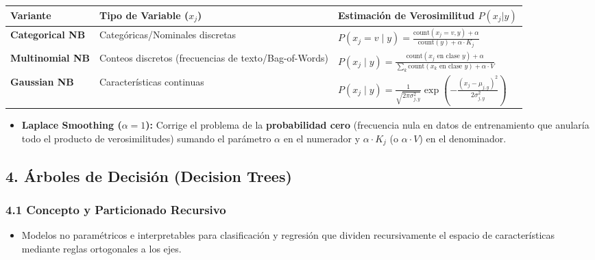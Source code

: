 \documentclass[11pt,oneside]{article}
\begin{document}
\begin{center}
\begin{tabularx}{\textwidth}{>{\raggedright\arraybackslash}X >{\raggedright\arraybackslash}X >{\raggedright\arraybackslash}X}
\toprule
Variante & Tipo de Variable (\(x_j\)) & Estimación de Verosimilitud \(P(x_j\vert{}y)\) \\
\midrule
\textbf{Categorical NB} & Categóricas/Nominales discretas & \(P(x_j = v \mid y) = \frac{\text{count}(x_j=v, y) + \alpha}{\text{count}(y) + \alpha \cdot K_j}\) \\
\textbf{Multinomial NB} & Conteos discretos (frecuencias de texto/Bag-of-Words) & \(P(x_j \mid y) = \frac{\text{count}(x_j \text{ en clase } y) + \alpha}{\sum_{k} \text{count}(x_k \text{ en clase } y) + \alpha \cdot V}\) \\
\textbf{Gaussian NB} & Características continuas & \(P(x_j \mid y) = \frac{1}{\sqrt{2\pi \sigma_{j,y}^2}} \exp\left(-\frac{(x_j - \mu_{j,y})^2}{2\sigma_{j,y}^2}\right)\) \\
\bottomrule
\end{tabularx}
\end{center}

\begin{itemize}

\item \textbf{Laplace Smoothing (\(\alpha=1\)):} Corrige el problema de la \textbf{probabilidad cero} (frecuencia nula en datos de entrenamiento que anularía todo el producto de verosimilitudes) sumando el parámetro \(\alpha\) en el numerador y \(\alpha \cdot K_j\) (o \(\alpha \cdot V\)) en el denominador.

\end{itemize}

\subsection{4. Árboles de Decisión (Decision Trees)}

\subsubsection{4.1 Concepto y Particionado Recursivo}

\begin{itemize}

\item Modelos no paramétricos e interpretables para clasificación y regresión que dividen recursivamente el espacio de características mediante reglas ortogonales a los ejes.

\end{itemize}
\end{document}
